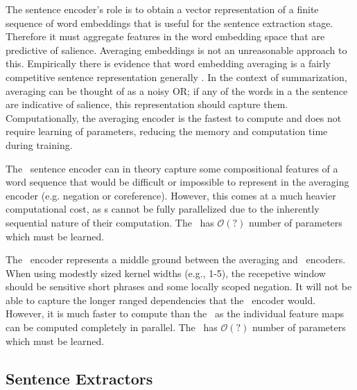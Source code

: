 The sentence encoder's role is to obtain a vector representation of a finite
sequence of word embeddings that is useful for the sentence extraction
stage. Therefore it must aggregate features in the word embedding space that
are predictive of salience. Averaging embeddings is not an unreasonable
approach to this. Empirically there is evidence that word embedding
averaging is a fairly competitive sentence representation generally \citep{someone,someoneelse}. In the context of summarization, averaging can be thought of
as a noisy OR; if any of the words in a the sentence are indicative 
of salience, this representation should capture them.
Computationally, the averaging encoder is the fastest to compute and does
not require learning of parameters, reducing the memory and computation time
during training. 

The \recurrentneuralnetwork~sentence encoder can in theory 
capture some compositional features of a word sequence 
 that would be difficult or impossible 
to represent in the averaging encoder
(e.g. negation or coreference).
However, this comes at a much heavier 
computational cost, as \recurrentneuralnetwork s cannot be fully parallelized 
due to the inherently sequential nature of their computation. {\color{red} The \recurrentneuralnetwork~has $\mathcal{O}(?)$ number of parameters which
must be learned.}

The \convolutionalneuralnetwork~encoder represents a middle ground between
the averaging and \recurrentneuralnetwork~encoders. When using modestly sized
kernel widths (e.g., 1-5), the recepetive window should be sensitive short
phrases and some locally scoped negation. It will not be able to capture
the longer ranged dependencies that the \recurrentneuralnetwork~encoder would.
However, it is much faster to compute than the \recurrentneuralnetwork~as 
the individual feature maps can be computed completely in parallel. 
{\color{red} The \convolutionalneuralnetwork~has $\mathcal{O}(?)$ number of parameters which
must be learned.}










\subsection{Sentence Extractors} \label{sec:sext}

